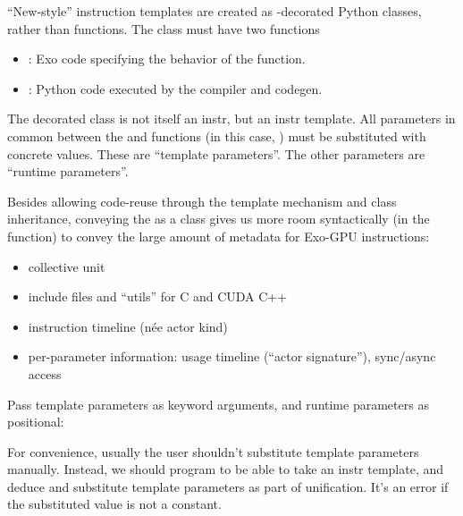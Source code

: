 \newpage
{}

``New-style'' instruction templates are created as -decorated Python classes, rather than functions.
The class must have two functions
\begin{itemize}
  \item {}: Exo code specifying the behavior of the function.
  \item {}: Python code executed by the compiler and codegen.
\end{itemize}



\filbreak
The decorated class is not itself an instr, but an instr template.
All parameters in common between the  and  functions (in this case, ) must be substituted with concrete values.
These are ``template parameters''.
The other  parameters are ``runtime parameters''.



\filbreak
Besides allowing code-reuse through the template mechanism and class inheritance, conveying the  as a class gives us more room syntactically (in the  function) to convey the large amount of metadata for Exo-GPU instructions:
\begin{itemize}
  \item collective unit
  \filbreak
  \item include files and ``utils'' for C and CUDA C++
  \filbreak
  \item instruction timeline (n\'ee actor kind)
  \filbreak
  \item per-parameter information: usage timeline (``actor signature''), sync/async access
\end{itemize}

\filbreak
{}

Pass template parameters as keyword arguments, and runtime parameters as positional:



\filbreak
{}

For convenience, usually the user shouldn't substitute template parameters manually.
Instead, we should program  to be able to take an instr template, and deduce and substitute template parameters as part of unification.
It's an error if the substituted value is not a constant.

